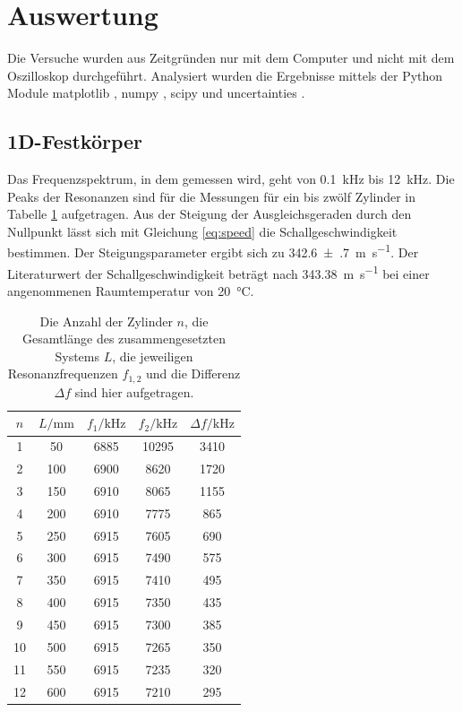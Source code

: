 \newpage
\section{Auswertung}
\label{sec:Auswertung}
 
Die Versuche wurden aus Zeitgründen nur mit dem Computer und nicht mit dem Oszilloskop durchgeführt. Analysiert wurden die Ergebnisse mittels der Python Module matplotlib \cite{matplotlib}, numpy \cite{numpy}, scipy \cite{scipy} und uncertainties \cite{uncertainties}.

\subsection{1D-Festkörper}

Das Frequenzspektrum, in dem gemessen wird, geht von \SI{0.1}{\kilo\hertz} bis \SI{12}{\kilo\hertz}. 
Die Peaks der Resonanzen sind für die Messungen für ein bis zwölf Zylinder in Tabelle \ref{tab:rohr} aufgetragen. Aus der Steigung der Ausgleichsgeraden durch den Nullpunkt lässt sich mit Gleichung \ref{eq:speed} die Schallgeschwindigkeit bestimmen. Der Steigungsparameter ergibt sich zu \SI{342.6(7)}{\meter\per\second}. 
Der Literaturwert der Schallgeschwindigkeit beträgt nach \cite{speed} \SI{343.38}{\metre\per\second} bei einer angenommenen Raumtemperatur von \SI{20}{\celsius}. 

\begin{table}\caption{Die Anzahl der Zylinder $n$, die Gesamtlänge des zusammengesetzten Systems $L$, die jeweiligen Resonanzfrequenzen $f_{1,2}$ und die Differenz $\Delta f$ sind hier aufgetragen.}
    \label{tab:rohr}
    \centering
     \begin{tabular}{c c | c c | c} 
    \toprule
{$n$} & {$L / \si{\milli\metre}$} & {$f_1 / \si{\kilo\hertz}$} & {$f_2 / \si{\kilo\hertz}$} & {$\Delta f / \si{\kilo\hertz}$} \\
\midrule
1     &    50   &  6885  &  10295 &   3410  \\
2     &   100   &  6900  &  8620  &   1720  \\
3     &   150   &  6910  &  8065  &   1155  \\ 
4     &   200   &  6910  &  7775  &   865  \\
5     &   250   &  6915  &  7605  &   690  \\
6     &   300   &  6915  &  7490  &   575  \\  
7     &   350   &  6915  &  7410  &   495  \\  
8     &   400   &  6915  &  7350  &   435  \\  
9     &   450   &  6915  &  7300  &   385  \\  
10    &   500   &  6915  &  7265  &   350  \\    
11    &   550   &  6915  &  7235  &   320  \\  
12    &   600   &  6915  &  7210  &   295  \\

\bottomrule
\end{tabular}\end{table}


